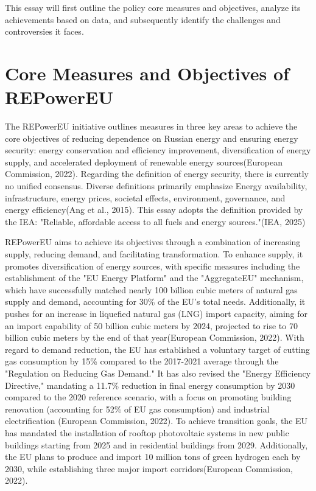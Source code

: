 \documentclass[12pt,a4paper]{article}
\begin{document}
This essay will first outline the policy core measures and objectives, analyze its achievements based on data, and subsequently identify the challenges and controversies it faces.

\section{Core Measures and Objectives of REPowerEU}
The REPowerEU initiative outlines measures in three key areas to achieve the core objectives of reducing dependence on Russian energy and ensuring energy security: energy conservation and efficiency 
improvement, diversification of energy supply, and accelerated deployment of renewable energy sources(European Commission, 2022). Regarding the definition of energy security, there is currently no 
unified consensus. Diverse definitions primarily emphasize Energy availability, infrastructure, energy prices, societal effects, environment, governance, and energy efficiency(Ang et al., 2015). This 
essay adopts the definition provided by the IEA: "Reliable, affordable access to all fuels and energy sources."(IEA, 2025)

REPowerEU aims to achieve its objectives through a combination of increasing supply, reducing demand, and facilitating transformation. To enhance supply, it promotes diversification of energy sources, 
with specific measures including the establishment of the "EU Energy Platform" and the "AggregateEU" mechanism, which have successfully matched nearly 100 billion cubic meters of natural gas supply and 
demand, accounting for 30\% of the EU's total needs. Additionally, it pushes for an increase in liquefied natural gas (LNG) import capacity, aiming for an import capability of 50 billion cubic meters by 
2024, projected to rise to 70 billion cubic meters by the end of that year(European Commission, 2022). With regard to demand reduction, the EU has established a voluntary target of cutting gas 
consumption by 15\% compared to the 2017-2021 average through the "Regulation on Reducing Gas Demand." It has also revised the "Energy Efficiency Directive," mandating a 11.7\% reduction in final energy 
consumption by 2030 compared to the 2020 reference scenario, with a focus on promoting building renovation (accounting for 52\% of EU gas consumption) and industrial electrification (European Commission, 
2022). To achieve transition goals, the EU has mandated the installation of rooftop photovoltaic systems in new public buildings starting from 2025 and in residential buildings from 2029. Additionally, 
the EU plans to produce and import 10 million tons of green hydrogen each by 2030, while establishing three major import corridors(European Commission, 2022).
\end{document}
